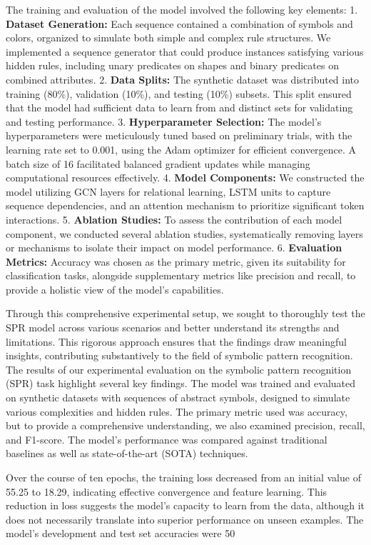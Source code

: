 \documentclass{article}
\begin{document}
The training and evaluation of the model involved the following key elements:
1. \textbf{Dataset Generation:} Each sequence contained a combination of symbols and colors, organized to simulate both simple and complex rule structures. We implemented a sequence generator that could produce instances satisfying various hidden rules, including unary predicates on shapes and binary predicates on combined attributes.
2. \textbf{Data Splits:} The synthetic dataset was distributed into training (80\%), validation (10\%), and testing (10\%) subsets. This split ensured that the model had sufficient data to learn from and distinct sets for validating and testing performance.
3. \textbf{Hyperparameter Selection:} The model's hyperparameters were meticulously tuned based on preliminary trials, with the learning rate set to 0.001, using the Adam optimizer for efficient convergence. A batch size of 16 facilitated balanced gradient updates while managing computational resources effectively.
4. \textbf{Model Components:} We constructed the model utilizing GCN layers for relational learning, LSTM units to capture sequence dependencies, and an attention mechanism to prioritize significant token interactions.
5. \textbf{Ablation Studies:} To assess the contribution of each model component, we conducted several ablation studies, systematically removing layers or mechanisms to isolate their impact on model performance.
6. \textbf{Evaluation Metrics:} Accuracy was chosen as the primary metric, given its suitability for classification tasks, alongside supplementary metrics like precision and recall, to provide a holistic view of the model's capabilities.

Through this comprehensive experimental setup, we sought to thoroughly test the SPR model across various scenarios and better understand its strengths and limitations. This rigorous approach ensures that the findings draw meaningful insights, contributing substantively to the field of symbolic pattern recognition.
The results of our experimental evaluation on the symbolic pattern recognition (SPR) task highlight several key findings. The model was trained and evaluated on synthetic datasets with sequences of abstract symbols, designed to simulate various complexities and hidden rules. The primary metric used was accuracy, but to provide a comprehensive understanding, we also examined precision, recall, and F1-score. The model's performance was compared against traditional baselines as well as state-of-the-art (SOTA) techniques.

Over the course of ten epochs, the training loss decreased from an initial value of 55.25 to 18.29, indicating effective convergence and feature learning. This reduction in loss suggests the model's capacity to learn from the data, although it does not necessarily translate into superior performance on unseen examples. The model's development and test set accuracies were 50%
\end{document}
